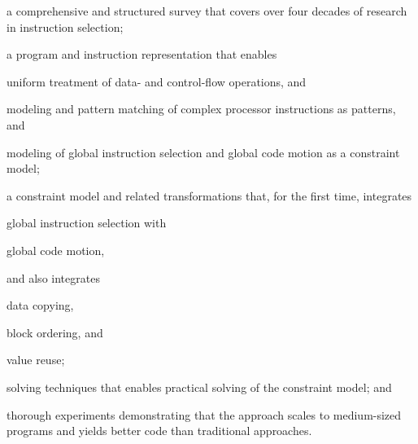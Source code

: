 \begin{contributions}
\item {}
    a comprehensive and structured survey that covers over four decades of
    research in instruction selection;
  \item {}
    a program and instruction representation that enables
    \begin{contributions}
      \item {}
        uniform treatment of data- and control-flow operations, and
      \item {}
        modeling and pattern matching of complex processor instructions as
        patterns, and
      \item {}
        modeling of global instruction selection and global code motion as a
        constraint model;
    \end{contributions}
  \item {}
    a constraint model and related transformations that, for the first time,
    integrates
    \begin{contributions}
      \item {}
        global instruction selection with
      \item {}
        global code motion,
    \end{contributions}
    and also integrates
    \begin{contributions}[resume]
      \item {}
        data copying,
      \item {}
        block ordering, and
      \item {}
        value reuse;
    \end{contributions}
  \item {}
    solving techniques that enables practical solving of the constraint model;
    and
  \item {}
    thorough experiments demonstrating that the approach scales to medium-sized
    programs and yields better code than traditional approaches.
\end{contributions}


